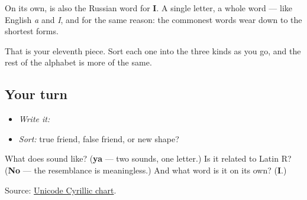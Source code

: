 On its own, \textbf{} is also the Russian word for \textbf{I}. A single letter, a whole word — like English \emph{a} and \emph{I}, and for the same reason: the commonest words wear down to the shortest forms.

That is your eleventh piece. Sort each one into the three kinds as you go, and the rest of the alphabet is more of the same.

\subsection*{Your turn}
\begin{itemize}
\raggedright
  \item \emph{Write it:} 
  \item \emph{Sort:} true friend, false friend, or new shape?
\end{itemize}

\begin{tcolorbox}[breakable,colback=teal!4,colframe=teal!35!black,title={Before you move on}]
What does \textbf{} sound like? (\textbf{ya} — two sounds, one letter.) Is it related to Latin R? (\textbf{No} — the resemblance is meaningless.) And what word is it on its own? (\textbf{I}.)

Source: \href{https://www.unicode.org/charts/PDF/U0400.pdf}{Unicode Cyrillic chart}.
\end{tcolorbox}
